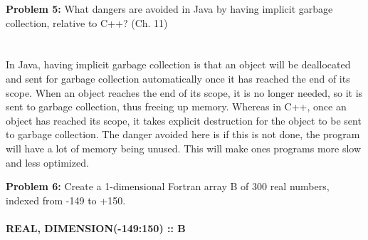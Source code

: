 \documentclass[11pt]{article}
\newenvironment{problem}[1]{\textbf{Problem #1: }}{\newpage}
\begin{document}
	\begin{problem}{5}
		What dangers are avoided in Java by having implicit garbage collection, relative to C++? (Ch. 11)
		\\ \\ \\
		In Java, having implicit garbage collection is that an object will be deallocated and sent for garbage collection automatically once it has reached the end of its scope.  When an object reaches the end of its scope, it is no longer needed, so it is sent to garbage collection, thus freeing up memory.  Whereas in C++, once an object has reached its scope, it takes explicit destruction for the object to be sent to garbage collection. The danger avoided here is if this is not done, the program will have a lot of memory being unused.  This will make ones programs more slow and less optimized.
	\end{problem}
	
	\begin{problem}{6}
		Create a 1-dimensional Fortran array B of 300 real numbers, indexed from -149 to +150.
		\\ \\
		\textbf{REAL, DIMENSION(-149:150) :: B}
	\end{problem}
	
\end{document}
